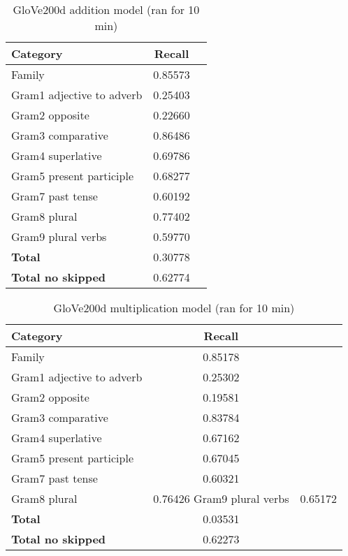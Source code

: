\begin{center}
    
    
    \begin{table}[h!]
        \begin{tabular}{| l | c | r}
        	\hline
        	\textbf{Category} &    \textbf{Recall}\\ \hline
        	Family 						& 0.85573 \\
        	Gram1 adjective to adverb 	& 0.25403 \\
        	Gram2 opposite 				& 0.22660 \\
        	Gram3 comparative 			& 0.86486 \\
        	Gram4 superlative 			& 0.69786 \\
        	Gram5 present participle	& 0.68277 \\
        	Gram7 past tense 			& 0.60192 \\
        	Gram8 plural 				& 0.77402 \\
        	Gram9 plural verbs 			& 0.59770 \\
        	\textbf{Total}				& 0.30778 \\
        	\textbf{Total no skipped}	& 0.62774 \\ \hline
        \end{tabular}
    \caption{GloVe200d addition model (ran for 10 min)}
    \label{table:glove200d_addition}
    \end{table}
    
    \begin{table}[h!]
        \begin{tabular}{| l | c | r}
        	\hline
        	\textbf{Category} &    \textbf{Recall}\\ \hline
        	Family 						& 0.85178 \\
        	Gram1 adjective to adverb 	& 0.25302 \\
        	Gram2 opposite 				& 0.19581 \\
        	Gram3 comparative 			& 0.83784 \\
        	Gram4 superlative 			& 0.67162 \\
        	Gram5 present participle	& 0.67045 \\
        	Gram7 past tense 			& 0.60321 \\
        	Gram8 plural 				& 0.76426
        	Gram9 plural verbs 			& 0.65172 \\
        	\textbf{Total}				& 0.03531 \\
        	\textbf{Total no skipped}	& 0.62273 \\ \hline
        \end{tabular}
    \caption{GloVe200d multiplication model (ran for 10 min)}
    \label{table:glove200d_multiplication}
    \end{table}
    

\end{center}
